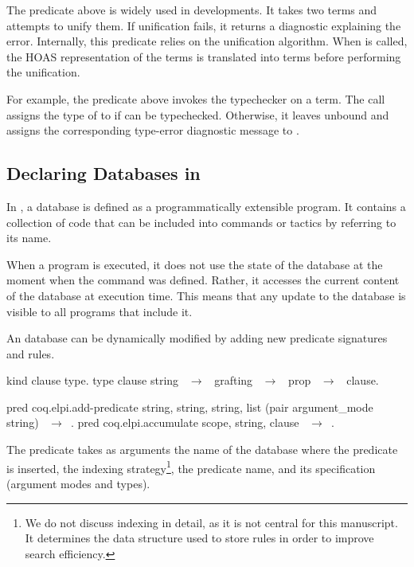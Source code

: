 The predicate above is widely used in \elpi developments. It takes two
terms and attempts to unify them. If unification fails, it returns a
diagnostic explaining the error. Internally, this predicate relies on
the \rocq unification algorithm. When  is called, the
HOAS representation of the terms is translated into \rocq terms before
performing the unification.
%
\begin{center}
\end{center}

For example, the predicate above invokes the \rocq typechecker on a term. The
call  assigns the type of  to  if 
can be typechecked. Otherwise, it leaves  unbound and assigns the
corresponding type-error diagnostic message to .

\subsection{Declaring Databases in \rocqelpi}
\label{sec:database}

In \cite[Sec. 4.4.3]{hdr}, a database is defined as a programmatically
extensible \elpi
program. It contains a collection of code that can be included into commands
or tactics by referring to its name.

When a program is executed, it does not use the state of the database at the
moment when the command was defined. Rather, it accesses the current content
of the database at execution time. This means that any update to the database
is visible to all programs that include it.

An \elpi database can be dynamically modified by adding new predicate
signatures and rules.

\begin{elpicode}
kind clause type.
type clause string ~$\to$~ grafting ~$\to$~ prop ~$\to$~ clause.

pred coq.elpi.add-predicate string,  string,   string,
                                  list (pair argument_mode string) ~$\to$~.
pred coq.elpi.accumulate scope, string, clause ~$\to$~.
\end{elpicode}

The  predicate takes as arguments the name of
the database where the predicate is inserted, the indexing
strategy\footnote{We do not discuss indexing in detail, as it is not
central for this manuscript. It determines the data structure used to
store rules in order to improve search efficiency.}, the predicate
name, and its specification (argument modes and types).


